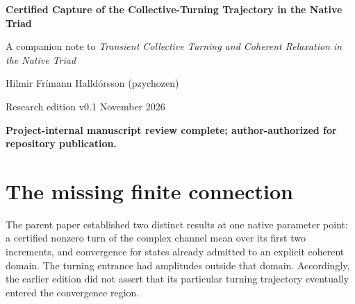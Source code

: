 \documentclass[11pt,a4paper]{article}
\numberwithin{equation}{section}
\theoremstyle{remark}\newtheorem{remark}[theorem]{Remark}
\begin{document}
\thispagestyle{plain}
{\LARGE\bfseries Certified Capture of the Collective-Turning Trajectory in the Native Triad\par}
\vspace{5pt}
{\normalsize A companion note to \emph{Transient Collective Turning and Coherent Relaxation in the Native Triad}\par}
\vspace{8pt}
{\large Hilmir Fr\'imann Halld\'orsson (pzychozen)\par}
{\small Research edition v0.1  November 2026\par}
{\small\bfseries Project-internal manuscript review complete; author-authorized for repository publication.\par}
\vspace{5pt}
\begin{abstract}
The original collective-turning example of the native triad was known to have a strict early turn, while a separate theorem established coherent relaxation for states in an invariant annulus and ordinary phase sector. We connect these results for the unchanged recurrence, rational coefficients and original exact entrance. A retained certificate encloses 50 full updates in one connected chain, starting from an exact singleton. A separate exact-fraction checker verifies the chain, nonzero prestages and strict terminal annulus and cone inequalities. These imply inclusion in the inherited coherent domain at update 50, a sufficient index rather than a certified earliest entry. The inherited theorem then gives convergence of the same turning trajectory to its positive unequal amplitude profile, up to a limiting common phase. Continuity also supplies an open neighborhood of entrances with both properties at the same coefficients, without an explicit radius. No parameter robustness, global basin or physical identification is asserted.
\end{abstract}

\section{The missing finite connection}\label{sec:question}
The parent paper \cite{parent} established two distinct results at one native parameter point: a certified nonzero turn of the complex channel mean over its first two increments, and convergence for states already admitted to an explicit coherent domain. The turning entrance had amplitudes outside that domain. Accordingly, the earlier edition did not assert that its particular turning trajectory eventually entered the convergence region.
\end{document}
